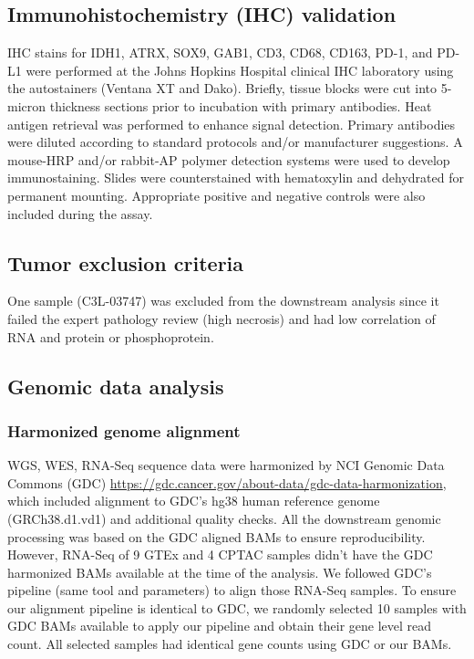 \subsection{Immunohistochemistry (IHC) validation}
IHC stains for IDH1, ATRX, SOX9, GAB1, CD3, CD68, CD163, PD-1, and PD-L1 were performed at the Johns Hopkins Hospital clinical IHC laboratory using the autostainers (Ventana XT and Dako). Briefly, tissue blocks were cut into 5-micron thickness sections prior to incubation with primary antibodies. Heat antigen retrieval was performed to enhance signal detection. Primary antibodies were diluted according to standard protocols and/or manufacturer suggestions. A mouse-HRP and/or rabbit-AP polymer detection systems were used to develop immunostaining. Slides were counterstained with hematoxylin and dehydrated for permanent mounting. Appropriate positive and negative controls were also included during the assay.


\subsection{Tumor exclusion criteria}
One sample (C3L-03747) was excluded from the downstream analysis since it failed the expert pathology review (high necrosis) and had low correlation of RNA and protein or phosphoprotein.


\subsection{Genomic data analysis}

\subsubsection{Harmonized genome alignment}
WGS, WES, RNA-Seq sequence data were harmonized by NCI Genomic Data Commons (GDC) \url{https://gdc.cancer.gov/about-data/gdc-data-harmonization}, which included alignment to GDC’s hg38 human reference genome (GRCh38.d1.vd1) and additional quality checks. All the downstream genomic processing was based on the GDC aligned BAMs to ensure reproducibility. However, RNA-Seq of 9 GTEx and 4 CPTAC samples didn’t have the GDC harmonized BAMs available at the time of the analysis. We followed GDC’s pipeline (same tool and parameters) to align those RNA-Seq samples. To ensure our alignment pipeline is identical to GDC, we randomly selected 10 samples with GDC BAMs available to apply our pipeline and obtain their gene level read count. All selected samples had identical gene counts using GDC or our BAMs.

